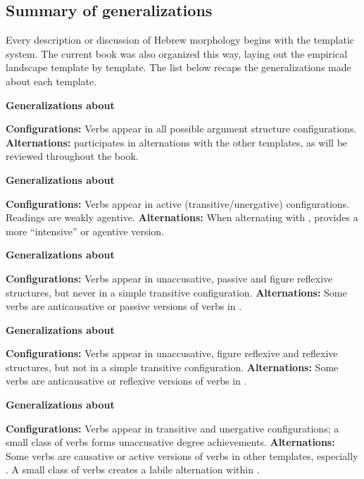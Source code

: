 	\subsection{Summary of generalizations}
Every description or discussion of Hebrew morphology begins with the templatic system. The current book was also organized this way, laying out the empirical landscape template by template. The list below recaps the generalizations made about each template.

 \begin{exe}
 \ex  \textbf{Generalizations about {\tkal}} 
 \begin{xlist} 
 	\ex  \textbf{Configurations:} Verbs appear in all possible argument structure configurations. 
 	\ex  \textbf{Alternations:} {\tkal} participates in alternations with the other templates, as will be reviewed throughout the book. 
 \z

 \ex  \textbf{Generalizations about {\tpie}} 
 \begin{xlist} 
 	\ex  \textbf{Configurations:} Verbs appear in active (transitive/unergative) configurations. 
		Readings are weakly agentive.
 	\ex  \textbf{Alternations:} When alternating with {\tkal}, {\tpie} provides a more ``intensive'' or agentive version. 
 \z

 \ex  \textbf{Generalizations about {\tnif}} 
 \begin{xlist} 
 	\ex  \textbf{Configurations:} Verbs appear in unaccusative, passive and figure reflexive structures, but never in a simple transitive configuration. 
 	\ex  \textbf{Alternations:} Some verbs are anticausative or passive versions of verbs in {\tkal}. 
 \z

 \ex  \textbf{Generalizations about {\thit}} 
 \begin{xlist} 
 	\ex  \textbf{Configurations:} Verbs appear in unaccusative, figure reflexive and reflexive structures, but not in a simple transitive configuration. 
 	\ex  \textbf{Alternations:} Some verbs are anticausative or reflexive versions of verbs in {\tpie}. 
 \z

 \ex  \textbf{Generalizations about {\thif}} 
 \begin{xlist} 
 	\ex  \textbf{Configurations:} Verbs appear in transitive and unergative configurations; a small class of verbs forms unaccusative degree achievements. 
 	\ex  \textbf{Alternations:} Some verbs are causative or active versions of verbs in other templates, especially {\tkal}. A small class of verbs creates a labile alternation within {\thif}. 
 \z


\end{xlist}
\end{xlist}
\end{xlist}
\end{xlist}
\end{xlist}
\end{exe}
